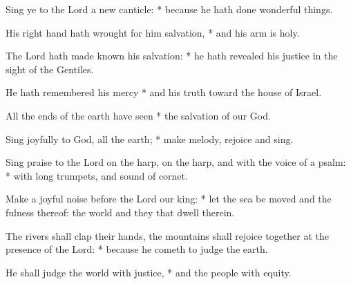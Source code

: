﻿\item Sing ye to the Lord a new canticle: * because he hath done wonderful things.
\item His right hand hath wrought for him salvation, * and his arm is holy.
\item The Lord hath made known his salvation: * he hath revealed his justice in the sight of the Gentiles.
\item He hath remembered his mercy * and his truth toward the house of Israel.
\item All the ends of the earth have seen * the salvation of our God.
\item Sing joyfully to God, all the earth; * make melody, rejoice and sing.
\item Sing praise to the Lord on the harp, on the harp, and with the voice of a psalm: * with long trumpets, and sound of cornet.
\item Make a joyful noise before the Lord our king: * let the sea be moved and the fulness thereof: the world and they that dwell therein.
\item The rivers shall clap their hands, the mountains shall rejoice together at the presence of the Lord: * because he cometh to judge the earth.
\item He shall judge the world with justice, * and the people with equity.